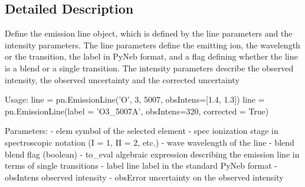 \subsection{Detailed Description}
\begin{DoxyVerb}Define the emission line object, which is defined by the line parameters and the intensity 
    parameters.
The line parameters define the emitting ion, the wavelength or the transition, the label 
    in PyNeb format, and a flag defining whether the line is a blend or a single transition. 
The intensity parameters describe the observed intensity, the observed uncertainty and 
    the corrected uncertainty
    
Usage:
    line = pn.EmissionLine('O', 3, 5007, obsIntens=[1.4, 1.3])
    line = pn.EmissionLine(label = 'O3_5007A', obsIntens=320, corrected = True)

Parameters:
    - elem        symbol of the selected element
    - spec        ionization stage in spectroscopic notation (I = 1, II = 2, etc.)
    - wave        wavelength of the line
    - blend       blend flag (boolean)
    - to_eval     algebraic expression describing the emission line in terms of single transitions
    - label       line label in the standard PyNeb format
    - obsIntens   observed intensity
    - obsError    uncertainty on the observed intensity\end{DoxyVerb}
 


